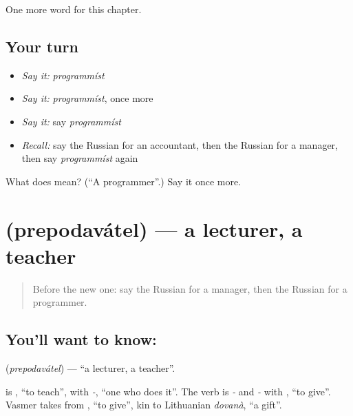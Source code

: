 \begin{grammarlens}[title={What you've built}]
One more word for this chapter.
\end{grammarlens}

\subsection*{Your turn}
\begin{itemize}
\raggedright
  \item \emph{Say it:} \emph{programmíst}
  \item \emph{Say it:} \emph{programmíst}, once more
  \item \emph{Say it:} say \emph{programmíst}
  \item \emph{Recall:} say the Russian for an accountant, then the Russian for a manager, then say \emph{programmíst} again
\end{itemize}

\begin{tcolorbox}[breakable,colback=teal!4,colframe=teal!35!black,title={Before you move on}]
What does  mean? (\textquotedblleft{}A programmer\textquotedblright{}.) Say it once more.
\end{tcolorbox}
\section[\texorpdfstring{\ru{преподаватель} (prepodavátel)}{преподаватель (prepodavátel)}]{ (prepodavátel) — a lecturer, a teacher}

\label{lesson:RU-C229-prepodavatel}



\begin{quote}
Before the new one: say the Russian for a manager, then the Russian for a programmer.
\end{quote}

\subsection*{You'll want to know: }
\textbf{} (\emph{prepodavátel}) — \textquotedblleft{}a lecturer, a teacher\textquotedblright{}.

\begin{cousinweb}
\textbf{} is \emph{}, \textquotedblleft{}to teach\textquotedblright{}, with \emph{-}, \textquotedblleft{}one who does it\textquotedblright{}. The verb is \emph{-} and \emph{-} with \emph{}, \textquotedblleft{}to give\textquotedblright{}. Vasmer takes \emph{} from \emph{}, \textquotedblleft{}to give\textquotedblright{}, kin to Lithuanian \emph{dovanà}, \textquotedblleft{}a gift\textquotedblright{}.
\end{cousinweb}

